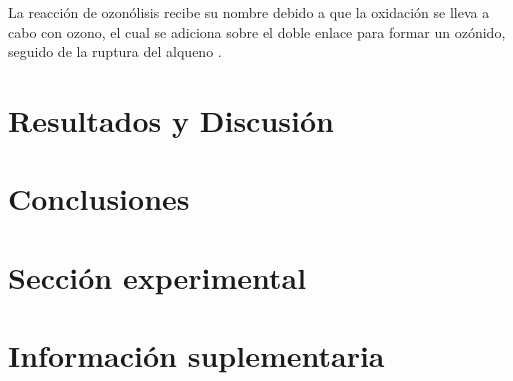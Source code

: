 \documentclass[fleqn,10pt]{SelfArx}
\begin{document}
La reacci\'on de ozon\'olisis recibe su nombre debido a que la oxidaci\'on se lleva a cabo con ozono, el cual se adiciona sobre el doble enlace para formar un oz\'onido, seguido de la ruptura del alqueno \cite{Morrison2002}.
\section{Resultados y Discusi\'on}

\section{Conclusiones}
\section{Secci\'on experimental}




\newpage
\onecolumn
\section{Informaci\'on suplementaria}\label{sec: complementaria}
\end{document}
